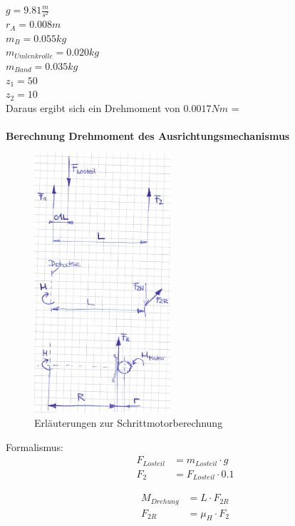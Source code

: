 $g = 9.81\frac{m}{s^2}$\\
$r_A = 0.008 m$\\
$m_B = 0.055 kg$\\
$m_{Umlenkrolle} = 0.020 kg$\\
$m_{Band} = 0.035 kg$\\
$z_1 = 50$\\
$z_2 = 10$\\
Daraus ergibt sich ein Drehmoment von $0.0017 Nm$ = \\
\\
\textbf{Berechnung Drehmoment des Ausrichtungsmechanismus}\\
\begin{figure}
	\centering
	\includegraphics[width=0.45\textwidth]{Enddokumentation/Anhang/Bilder/NotizBerechnungDrehmomentStepper.jpg}
	\caption{Erläuterungen zur Schrittmotorberechnung}	
\end{figure}
Formalismus:
\begin{align}
    F_{Losteil} &= m_{Losteil} \cdot g\\
    F_2 &= F_{Losteil} \cdot 0.1
\end{align}

\begin{align}
    M_{Drehung} &= L \cdot F_{2R}\\
    F_{2R} &= \mu_H \cdot F_2
\end{align}

